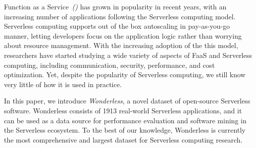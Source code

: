 %
%
Function as a Service~\emph{(\faas)} has grown in popularity in recent years, 
with an increasing number of applications following the Serverless computing model. 
Serverless computing supports out of the box autoscaling in pay-as-you-go manner, 
letting developers focus on the application logic rather than worrying 
about resource management. 
%
With the increasing adoption of the this model, researchers have started 
studying a wide variety of aspects of FaaS and Serverless computing, 
including communication, security, performance, and cost optimization. 
Yet, despite the popularity of Serverless computing, we still know very little of how it 
is used in practice.

In this paper, we introduce \emph{Wonderless}, a novel dataset
of open-source Serverless software. 
Wonderless consists of 1913 real-world Serverless applications, 
and it can be used as a data source for performance evaluation and 
software mining in the Serverless ecosystem. To the best of our knowledge, 
Wonderless is currently the most comprehensive and largest dataset
for Serverless computing research.


